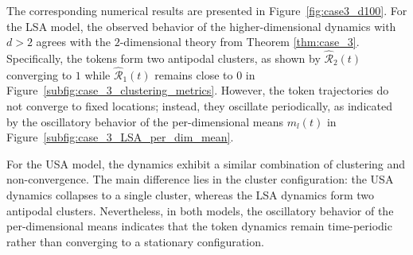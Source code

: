 \documentclass[10pt]{article}
\theoremstyle{definition}
\theoremstyle{definition}
\numberwithin{equation}{section}
\newcommand{\CR}{\mathcal{R}}
\begin{document}
The corresponding numerical results are presented in Figure~\ref{fig:case3_d100}.
For the LSA model, the observed behavior of the higher-dimensional dynamics with $d > 2$ agrees with the $2$-dimensional theory from Theorem \ref{thm:case_3}.
Specifically, the tokens form two antipodal clusters, as shown by $\widehat{\CR}_2(t)$ converging to $1$ while $\widehat{\CR}_1(t)$ remains close to $0$ in Figure~\ref{subfig:case_3_clustering_metrics}.
However, the token trajectories do not converge to fixed locations; instead, they oscillate periodically, as indicated by the oscillatory behavior of the per-dimensional means $m_l(t)$ in Figure~\ref{subfig:case_3_LSA_per_dim_mean}.

For the USA model, the dynamics exhibit a similar combination of clustering and non-convergence.
The main difference lies in the cluster configuration: the USA dynamics collapses to a single cluster, whereas the LSA dynamics form two antipodal clusters.
Nevertheless, in both models, the oscillatory behavior of the per-dimensional means indicates that the token dynamics remain time-periodic rather than converging to a stationary configuration.
\end{document}
